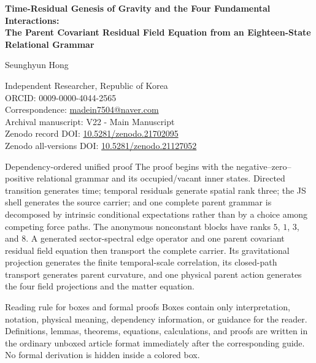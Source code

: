 \documentclass[11pt]{article}
\numberwithin{equation}{section}
\theoremstyle{remark}
\newcommand{\doi}[1]{\href{https://doi.org/#1}{#1}}
\begin{document}
\begin{center}
\vspace*{0.42cm}
{\Large\bfseries Time-Residual Genesis of Gravity and the Four Fundamental Interactions:\\[2mm]
The Parent Covariant Residual Field Equation from an Eighteen-State Relational Grammar\par}
\vspace{0.78cm}
{\large Seunghyun Hong\par}
Independent Researcher, Republic of Korea\\
ORCID: 0009-0000-4044-2565\\
Correspondence: \href{mailto:madein7504@naver.com}{madein7504@naver.com}\\
Archival manuscript: V22 - Main Manuscript\\
Zenodo record DOI: \doi{10.5281/zenodo.21702095}\\
Zenodo all-versions DOI: \doi{10.5281/zenodo.21127052}\\
\vspace{0.60cm}
\end{center}

\begin{blueledger}{Dependency-ordered unified proof}
The proof begins with the negative--zero--positive relational grammar and its occupied/vacant inner states. Directed transition generates time; temporal residuals generate spatial rank three; the JS shell generates the source carrier; and one complete parent grammar is decomposed by intrinsic conditional expectations rather than by a choice among competing force paths. The anonymous nonconstant blocks have ranks $5$, $1$, $3$, and $8$. A generated sector-spectral edge operator and one parent covariant residual field equation then transport the complete carrier. Its gravitational projection generates the finite temporal-scale correlation, its closed-path transport generates parent curvature, and one physical parent action generates the four field projections and the matter equation.
\end{blueledger}

\begin{blueledger}{Reading rule for boxes and formal proofs}
Boxes contain only interpretation, notation, physical meaning, dependency information, or guidance for the reader. Definitions, lemmas, theorems, equations, calculations, and proofs are written in the ordinary unboxed article format immediately after the corresponding guide. No formal derivation is hidden inside a colored box.
\end{blueledger}
\end{document}
